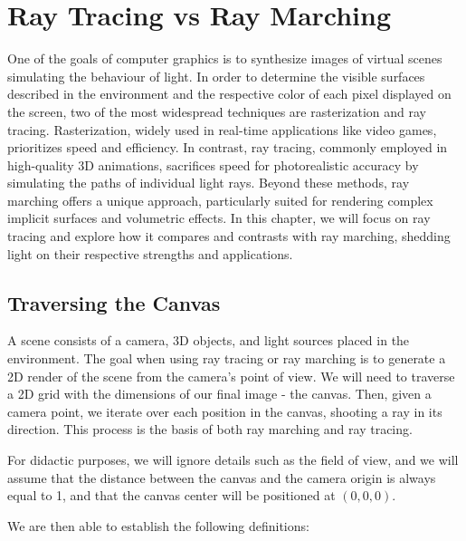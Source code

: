 \chapter{Ray Tracing vs Ray Marching}\label{chp:LABEL_CHP_2}

One of the goals of computer graphics is to synthesize images of virtual scenes simulating the behaviour of light. In order to determine the visible surfaces described in the environment and the respective color of each pixel displayed on the screen, two of the most widespread techniques are rasterization and ray tracing. Rasterization, widely used in real-time applications like video games, prioritizes speed and efficiency. In contrast, ray tracing, commonly employed in high-quality 3D animations, sacrifices speed for photorealistic accuracy by simulating the paths of individual light rays. Beyond these methods, ray marching offers a unique approach, particularly suited for rendering complex implicit surfaces and volumetric effects. In this chapter, we will focus on ray tracing and explore how it compares and contrasts with ray marching, shedding light on their respective strengths and applications.

\section{Traversing the Canvas}

A scene consists of a camera, 3D objects, and light sources placed in the environment. The goal when using ray tracing or ray marching is to generate a 2D render of the scene from the camera's point of view. We will need to traverse a 2D grid with the dimensions of our final image - the canvas. Then, given a camera point, we iterate over each position in the canvas, shooting a ray in its direction. This process is the basis of both ray marching and ray tracing.


For didactic purposes, we will ignore details such as the field of view, and we will assume that the distance between the canvas and the camera origin is always equal to 1, and that the canvas center will be positioned at $(0, 0, 0)$.

We are then able to establish the following definitions:

